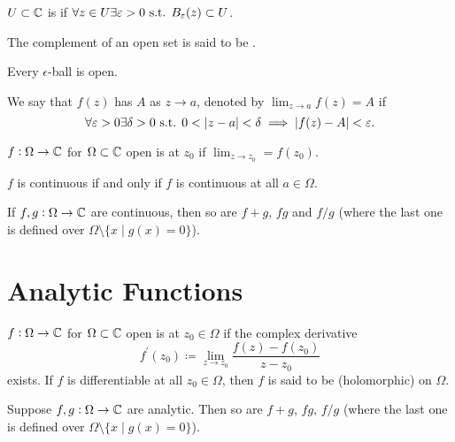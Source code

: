 \begin{definition}
$U\subset\mathbb C$ is  if $\forall z\in U\exists\varepsilon>0\text{ s.t. } B_\varepsilon(z)\subset U$.
\end{definition}

The complement of an open set is said to be .

\begin{proposition}
Every $\epsilon$-ball is open.
\end{proposition}

\begin{definition}[Limit]
We say that $f(z)$ has  $A$ as $z\to a$, denoted by $\lim_{z\to a}f(z)=A$ if 
\[\forall\epsilon>0\exists\delta>0\suchthat0<|z-a|<\delta\implies|f(z)-A|<\epsilon.\]
\end{definition}

\begin{definition}[Continuity]
$f:\Omega\to\mathbb C$ for $\Omega\subset\mathbb C$ open is  at $z_0$ if $\displaystyle\lim_{z\to z_0}=f(z_0)$.
\end{definition}

\begin{proposition}
$f$ is continuous if and only if $f$ is continuous at all $a\in\Omega$.
\end{proposition}

\begin{proposition}
If $f,g:\Omega\to\mathbb C$ are continuous, then so are $f+g$, $fg$ and $f/g$ (where the last one is defined over $\Omega\setminus\{x\mid g(x)=0\}$).
\end{proposition}

\section{Analytic Functions}
\begin{definition}
$f:\Omega\to\mathbb C$ for $\Omega\subset\mathbb C$ open is  at $z_0\in\Omega$ if the complex derivative
\[f^\prime(z_0)\coloneqq\lim_{z\to z_0}\frac{f(z)-f(z_0)}{z-z_0}\]
exists. If $f$ is differentiable at all $z_0\in\Omega$, then $f$ is said to be  (holomorphic) on $\Omega$.
\end{definition}

\begin{proposition}
Suppose $f,g:\Omega\to\mathbb C$ are analytic. Then so are $f+g$, $fg$, $f/g$ (where the last one is defined
over $\Omega\setminus\{x\mid g(x)=0\}$).
\end{proposition}


